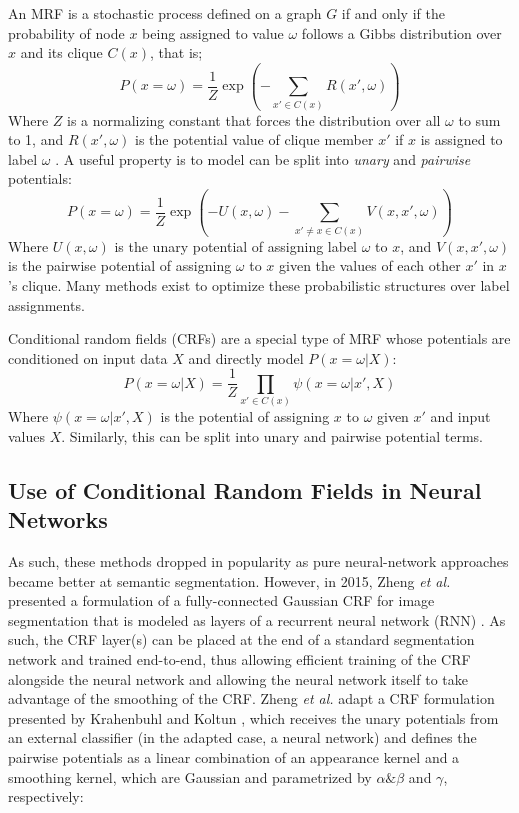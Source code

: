 \documentclass[10pt,twocolumn,letterpaper]{article}
\begin{document}
An MRF is a stochastic process defined on a graph $G$ if and only if the probability of node $x$
being assigned to value $\omega$ follows a Gibbs distribution over $x$ and its clique $C(x)$, that is;
\[ P(x = \omega) = \frac1{Z} \exp \left( - \sum_{x' \in C(x)} R(x', \omega) \right) \]
Where $Z$ is a normalizing constant that forces the distribution over all $\omega$ to sum to 1, and $R(x', \omega)$ is the potential value of clique member $x'$ if $x$ is assigned to label $\omega$ \cite{Gewali2018ATO}.
A useful property is to model can be split into \textit{unary} and \textit{pairwise} potentials:
\[ P(x = \omega) = \frac1{Z} \exp \left( - U(x, \omega) - \sum_{x' \neq x \in C(x)} V(x, x', \omega) \right) \]
Where $U(x, \omega)$ is the unary potential of assigning label $\omega$ to $x$, and $V(x, x', \omega)$ is the pairwise potential of assigning $\omega$ to $x$ given the values of each other $x'$
in $x$'s clique. Many methods exist to optimize these probabilistic structures over label assignments.

Conditional random fields (CRFs) are a special type of MRF whose potentials are conditioned on input data $X$ and directly model $P(x = \omega | X)$:
\begin{equation}
P(x = \omega | X) = \frac1{Z} \prod_{x' \in C(x)} \psi(x = \omega | x', X)
\end{equation}
Where $\psi(x = \omega | x', X)$ is the potential of assigning $x$ to $\omega$ given $x'$ and input values $X$. Similarly, this can be split into unary and pairwise potential terms.

\subsection{Use of Conditional Random Fields in Neural Networks}
As such, these methods dropped in popularity as pure neural-network approaches became better at semantic segmentation. 
However, in 2015, Zheng \textit{et al.} presented a formulation of a fully-connected Gaussian CRF for image segmentation that 
is modeled as layers of a recurrent neural network (RNN) \cite{Zheng_2015}. As such, the CRF layer(s) can be placed at the end of a standard segmentation network and trained 
end-to-end, thus allowing efficient training of the CRF alongside the neural network and allowing the neural network itself to take advantage of the smoothing 
of the CRF. Zheng \textit{et al.} adapt a CRF formulation presented by Krahenbuhl and Koltun \cite{krhenbhl2012efficient}, which receives the unary potentials from an 
external classifier (in the adapted case, a neural network) and defines the pairwise potentials as a linear combination of an appearance kernel and a smoothing 
kernel, which are Gaussian and parametrized by $\alpha \& \beta$ and $\gamma$, respectively:
\end{document}
